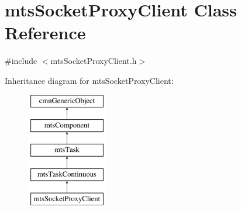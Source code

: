 \hypertarget{classmts_socket_proxy_client}{}\section{mts\+Socket\+Proxy\+Client Class Reference}
\label{classmts_socket_proxy_client}


{\ttfamily \#include $<$mts\+Socket\+Proxy\+Client.\+h$>$}

Inheritance diagram for mts\+Socket\+Proxy\+Client\+:\begin{figure}[H]
\begin{center}
\leavevmode
\includegraphics[height=5.000000cm]{d4/d65/classmts_socket_proxy_client}
\end{center}
\end{figure}
